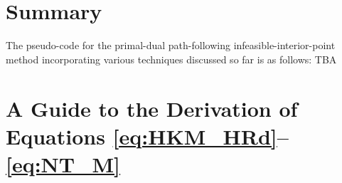 \documentclass{scrartcl}
\begin{document}
\section{Summary}
The pseudo-code for the primal-dual path-following infeasible-interior-point method incorporating various techniques discussed so far is as follows:
TBA


\appendix
\section{A Guide to the Derivation of Equations \eqref{eq:HKM_HRd}--\eqref{eq:NT_M}} \label{sec:guide_for_dir_eq}

\end{document}
